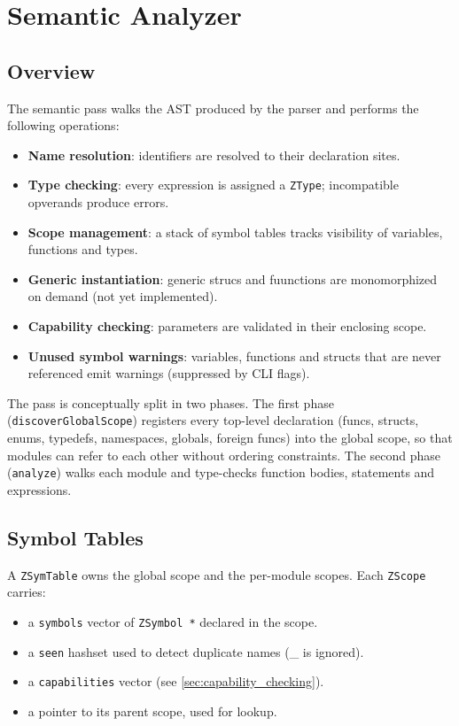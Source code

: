 \chapter{Semantic Analyzer}
\label{ch:semantics}

\section{Overview}

The semantic pass walks the AST produced by the parser and performs the following operations:
\begin{itemize}
    \item{\textbf{Name resolution}}: identifiers are resolved to their declaration sites.
    \item{\textbf{Type checking}}: every expression is assigned a \texttt{ZType}; incompatible opverands produce errors.
    \item{\textbf{Scope management}}: a stack of symbol tables tracks visibility of variables, functions and types.
    \item{\textbf{Generic instantiation}}: generic strucs and fuunctions are monomorphized on demand (not yet implemented).
    \item{\textbf{Capability checking}}:  parameters are validated in their enclosing scope.
    \item{\textbf{Unused symbol warnings}}: variables, functions and structs that are never referenced emit warnings (suppressed by CLI flags).
\end{itemize}

The pass is conceptually split in two phases. The first phase (\texttt{discoverGlobalScope}) registers every top-level declaration (funcs, structs, enums, typedefs, namespaces, globals, foreign funcs) into the global scope, so that modules can refer to each other without ordering constraints. The second phase (\texttt{analyze}) walks each module and type-checks function bodies, statements and expressions.


\section{Symbol Tables}
A \texttt{ZSymTable} owns the global scope and the per-module scopes.
Each \texttt{ZScope} carries:
\begin{itemize}
    \item a \texttt{symbols} vector of \texttt{ZSymbol *} declared in the scope.
    \item a \texttt{seen} hashset used to detect duplicate names (\_ is ignored).
    \item a \texttt{capabilities} vector (see \ref{sec:capability_checking}).
    \item a pointer to its parent scope, used for lookup.
\end{itemize}

